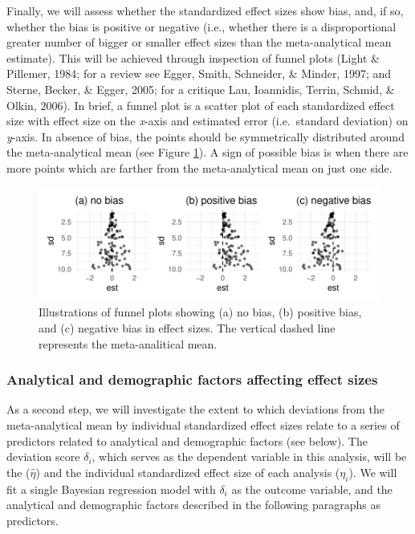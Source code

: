 \documentclass[
  english,
  man,floatsintext]{apa6}
\begin{document}
Finally, we will assess whether the standardized effect sizes show bias, and, if so, whether the bias is positive or negative (i.e., whether there is a disproportional greater number of bigger or smaller effect sizes than the meta-analytical mean estimate).
This will be achieved through inspection of funnel plots (Light \& Pillemer, 1984; for a review see Egger, Smith, Schneider, \& Minder, 1997; and Sterne, Becker, \& Egger, 2005; for a critique Lau, Ioannidis, Terrin, Schmid, \& Olkin, 2006).
In brief, a funnel plot is a scatter plot of each standardized effect size with effect size on the \emph{x}-axis and estimated error (i.e.~standard deviation) on \emph{y}-axis.
In absence of bias, the points should be symmetrically distributed around the meta-analytical mean (see Figure \ref{fig:funnel-plot}).
A sign of possible bias is when there are more points which are farther from the meta-analytical mean on just one side.

\begin{figure}
\centering
\includegraphics{Draft_RR_files/figure-latex/funnel-plot-1.pdf}
\caption{\label{fig:funnel-plot}Illustrations of funnel plots showing (a) no bias, (b) positive bias, and (c) negative bias in effect sizes. The vertical dashed line represents the meta-analitical mean.}
\end{figure}

\hypertarget{ana-factors}{%
\subsubsection{Analytical and demographic factors affecting effect sizes}\label{ana-factors}}

As a second step, we will investigate the extent to which deviations from the meta-analytical mean by individual standardized effect sizes relate to a series of predictors related to analytical and demographic factors (see below).
The deviation score \(\delta_i\), which serves as the dependent variable in this analysis, will be the  (\(\hat{\eta}\)) and the individual standardized effect size of each analysis (\(\eta_i\)).
We will fit a single Bayesian regression model with \(\delta_i\) as the outcome variable, and the analytical and demographic factors described in the following paragraphs as predictors.
\end{document}
